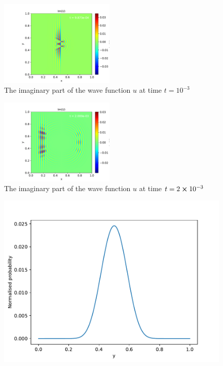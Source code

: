 \documentclass[english,notitlepage,reprint,nofootinbib]{revtex4-2}  %
\begin{document}
	\begin{figure}[h!]
		\centering
		\includegraphics[width=0.49\textwidth]{figures/problem8_U_Im_0.001.pdf}
		\caption{The imaginary part of the wave function $u$ at time $t = 10^{-3}$}
		\label{fig:prob8_Im1}
	\end{figure}
	
	\begin{figure}[h!]
		\centering
		\includegraphics[width=0.49\textwidth]{figures/problem8_U_Im_0.002.pdf}
		\caption{The imaginary part of the wave function $u$ at time $t = 2\cross10^{-3}$}
		\label{fig:prob8_Im2}
	\end{figure}

	\begin{figure}[h!]
		\centering
		\includegraphics[scale=0.55]{figures/problem9_single_slit.pdf}
		\caption{}
		\label{fig:prob9_single}
	\end{figure}
	
\end{document}
